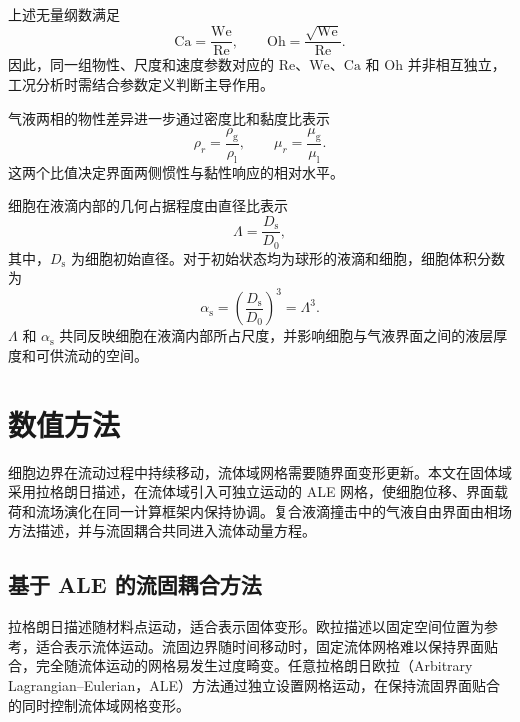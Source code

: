 上述无量纲数满足
\begin{equation}
\mathrm{Ca}
=
\frac{\mathrm{We}}{\mathrm{Re}},
\qquad
\mathrm{Oh}
=
\frac{\sqrt{\mathrm{We}}}{\mathrm{Re}}.
\label{eq:ch2_dimensionless_relation}
\end{equation}
因此，同一组物性、尺度和速度参数对应的 $\mathrm{Re}$、$\mathrm{We}$、$\mathrm{Ca}$ 和 $\mathrm{Oh}$ 并非相互独立，工况分析时需结合参数定义判断主导作用。

气液两相的物性差异进一步通过密度比和黏度比表示
\begin{equation}
\rho_r
=
\frac{\rho_{\mathrm g}}{\rho_{\mathrm l}},
\qquad
\mu_r
=
\frac{\mu_{\mathrm g}}{\mu_{\mathrm l}}.
\label{eq:ch2_property_ratio}
\end{equation}
这两个比值决定界面两侧惯性与黏性响应的相对水平。

细胞在液滴内部的几何占据程度由直径比表示
\begin{equation}
\Lambda
=
\frac{D_{\mathrm s}}{D_0},
\label{eq:ch2_size_ratio}
\end{equation}
其中，$D_{\mathrm s}$ 为细胞初始直径。对于初始状态均为球形的液滴和细胞，细胞体积分数为
\begin{equation}
\alpha_{\mathrm s}
=
\left(\frac{D_{\mathrm s}}{D_0}\right)^3
=
\Lambda^3.
\label{eq:ch2_volume_fraction}
\end{equation}
$\Lambda$ 和 $\alpha_{\mathrm s}$ 共同反映细胞在液滴内部所占尺度，并影响细胞与气液界面之间的液层厚度和可供流动的空间。

\section{数值方法}
\label{sec:ch2_numerical_method}

细胞边界在流动过程中持续移动，流体域网格需要随界面变形更新。本文在固体域采用拉格朗日描述，在流体域引入可独立运动的 ALE 网格，使细胞位移、界面载荷和流场演化在同一计算框架内保持协调。复合液滴撞击中的气液自由界面由相场方法描述，并与流固耦合共同进入流体动量方程。

\subsection{基于 ALE 的流固耦合方法}
\label{subsec:ch2_ale}

拉格朗日描述随材料点运动，适合表示固体变形。欧拉描述以固定空间位置为参考，适合表示流体运动。流固边界随时间移动时，固定流体网格难以保持界面贴合，完全随流体运动的网格易发生过度畸变。任意拉格朗日欧拉（Arbitrary Lagrangian--Eulerian，ALE）方法通过独立设置网格运动，在保持流固界面贴合的同时控制流体域网格变形\cite{hirt1974ale,hughes1981ale,donea2004ale}。

